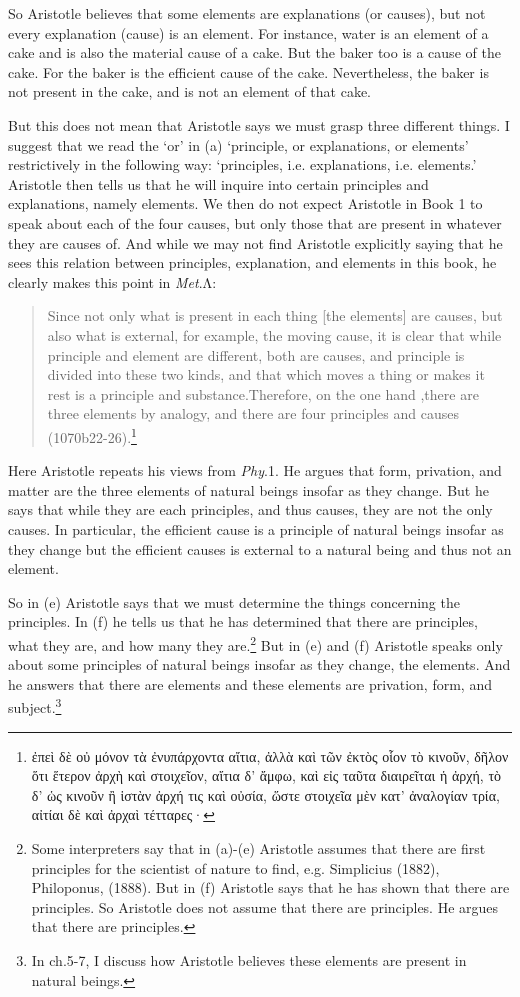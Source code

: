 \documentclass[10pt, oneside]{book}
\newcommand{\greek}[1]{{\selectlanguage{polutonikogreek}#1}}
\begin{document}
So Aristotle believes that some elements are explanations (or causes), but not every explanation (cause) is an element. For instance, water is an element of a cake and is also the material cause of a cake. But the baker too is a cause of the cake. For the baker is the efficient cause of the cake. Nevertheless, the baker is not present in the cake, and is not an element of that cake.   

But this does not mean that Aristotle says we must grasp three different things. I suggest that we read the `or' in (a) `principle, or explanations, or elements' restrictively in the following way: `principles, i.e. explanations, i.e. elements.' Aristotle then tells us that he will inquire into certain principles and explanations, namely elements. We then do not expect Aristotle in Book 1 to speak about each of the four causes, but only those that are present in whatever they are causes of. And while we may not find Aristotle explicitly saying that he sees this relation between principles, explanation, and elements in this book, he clearly makes this point in \emph{Met}.\greek{Λ}:
\begin{quote}
Since not only what is present in each thing [the elements] are causes, but also what is external, for example, the moving cause, it is clear that while principle and element are different, both are causes, and principle is divided into these two kinds, and that which moves a thing or makes it rest is a principle and substance.Therefore, on the one hand ,there are three elements by analogy, and there are four principles and causes (1070b22-26).\footnote{\greek{ἐπεὶ δὲ οὐ μόνον τὰ ἐνυπάρχοντα αἴτια, ἀλλὰ καὶ τῶν ἐκτὸς οἷον τὸ κινοῦν, δῆλον ὅτι ἕτερον ἀρχὴ καὶ στοιχεῖον,
αἴτια δ’ ἄμφω, καὶ εἰς ταῦτα διαιρεῖται ἡ ἀρχή, τὸ δ’ ὡς κινοῦν ἢ ἱστὰν ἀρχή τις καὶ οὐσία, ὥστε στοιχεῖα μὲν κατ’ ἀναλογίαν τρία, αἰτίαι δὲ καὶ ἀρχαὶ τέτταρες·}}
\end{quote}
Here Aristotle repeats his views from \emph{Phy}.1. He argues that form, privation, and matter are the three elements of natural beings insofar as they change. But he says that while they are each principles, and thus causes, they are not the only causes. In particular, the efficient cause is a principle of natural beings insofar as they change but the efficient causes is external to a natural being and thus not an element.

So in (e) Aristotle says that we must determine the things concerning the principles.   In (f) he tells us that he has determined that there are principles, what they are, and how many they are.\footnote{Some interpreters say that in (a)-(e) Aristotle assumes that there are first principles for the scientist of nature to find, e.g.  Simplicius (1882), Philoponus, (1888). But in (f) Aristotle says  that he has shown that there are principles. So Aristotle does not assume that there are principles. He argues that there are principles.} But  in (e) and (f) Aristotle  speaks only about some principles of natural beings insofar as they change, the elements.  And he answers that there are elements and these elements are privation, form, and subject.\footnote{In ch.5-7, I discuss how Aristotle believes these elements are present in natural beings.}
\end{document}
